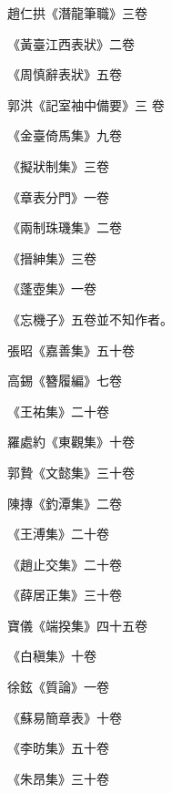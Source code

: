 \begin{pinyinscope}
 趙仁拱《潛龍筆職》三卷



 《黃臺江西表狀》二卷



 《周慎辭表狀》五卷



 郭洪《記室袖中備要》三
 卷



 《金臺倚馬集》九卷



 《擬狀制集》三卷



 《章表分門》一卷



 《兩制珠璣集》二卷



 《搢紳集》三卷



 《蓬壺集》一卷



 《忘機子》五卷並不知作者。



 張昭《嘉善集》五十卷



 高錫《簪履編》七卷



 《王祐集》二十卷



 羅處約《東觀集》十卷



 郭贄《文懿集》三十卷



 陳摶《釣潭集》二卷



 《王溥集》二十卷



 《趙止交集》二十卷



 《薛居正集》三十卷



 寶儀《端揆集》四十五卷



 《白稹集》十卷



 徐鉉《質論》一卷



 《蘇易簡章表》十卷



 《李昉集》五十卷



 《朱昂集》三十卷




\end{pinyinscope}
